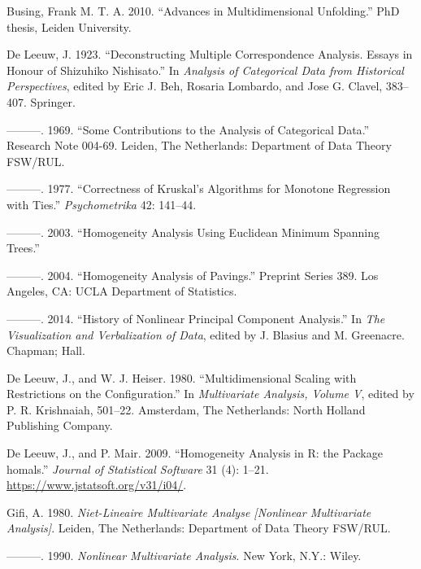 \documentclass[
  12pt,
]{article}
\newlength{\cslhangindent}
\newenvironment{CSLReferences}[2] %
 {\begin{list}{}{%
  \setlength{\itemindent}{0pt}
  \setlength{\leftmargin}{0pt}
  \setlength{\parsep}{0pt}
  \ifodd #1
   \setlength{\leftmargin}{\cslhangindent}
   \setlength{\itemindent}{-1\cslhangindent}
  \fi
  \setlength{\itemsep}{#2\baselineskip}}}
 {\end{list}}
\begin{document}
\label{refs}
\begin{CSLReferences}{1}{0}
Busing, Frank M. T. A. 2010. {``Advances in Multidimensional Unfolding.''} PhD thesis, Leiden University.

De Leeuw, J. 1923. {``Deconstructing Multiple Correspondence Analysis. Essays in Honour of Shizuhiko Nishisato.''} In \emph{Analysis of Categorical Data from Historical Perspectives}, edited by Eric J. Beh, Rosaria Lombardo, and Jose G. Clavel, 383--407. Springer.

---------. 1969. {``{Some Contributions to the Analysis of Categorical Data}.''} Research Note 004-69. Leiden, The Netherlands: Department of Data Theory FSW/RUL.

---------. 1977. {``Correctness of Kruskal's Algorithms for Monotone Regression with Ties.''} \emph{Psychometrika} 42: 141--44.

---------. 2003. {``{Homogeneity Analysis Using Euclidean Minimum Spanning Trees}.''}

---------. 2004. {``{Homogeneity Analysis of Pavings}.''} Preprint Series 389. Los Angeles, CA: UCLA Department of Statistics.

---------. 2014. {``{History of Nonlinear Principal Component Analysis}.''} In \emph{{The Visualization and Verbalization of Data}}, edited by J. Blasius and M. Greenacre. Chapman; Hall.

De Leeuw, J., and W. J. Heiser. 1980. {``Multidimensional Scaling with Restrictions on the Configuration.''} In \emph{Multivariate Analysis, Volume {V}}, edited by P. R. Krishnaiah, 501--22. Amsterdam, The Netherlands: North Holland Publishing Company.

De Leeuw, J., and P. Mair. 2009. {``{Homogeneity Analysis in {R}: the Package homals}.''} \emph{Journal of Statistical Software} 31 (4): 1--21. \url{https://www.jstatsoft.org/v31/i04/}.

Gifi, A. 1980. \emph{Niet-Lineaire Multivariate Analyse {[}Nonlinear Multivariate Analysis{]}}. Leiden, The Netherlands: Department of Data Theory FSW/RUL.

---------. 1990. \emph{Nonlinear Multivariate Analysis}. New York, N.Y.: Wiley.


\end{CSLReferences}
\end{document}
